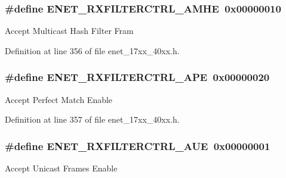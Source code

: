 \subsubsection[{\texorpdfstring{E\+N\+E\+T\+\_\+\+R\+X\+F\+I\+L\+T\+E\+R\+C\+T\+R\+L\+\_\+\+A\+M\+HE}{ENET_RXFILTERCTRL_AMHE}}]{\setlength{\rightskip}{0pt plus 5cm}\#define E\+N\+E\+T\+\_\+\+R\+X\+F\+I\+L\+T\+E\+R\+C\+T\+R\+L\+\_\+\+A\+M\+HE~0x00000010}\hypertarget{group__ENET__17XX__40XX_ga9d6abb88eb71199e6b8206c71ecc1148}{}\label{group__ENET__17XX__40XX_ga9d6abb88eb71199e6b8206c71ecc1148}
Accept Multicast Hash Filter Fram 

Definition at line 356 of file enet\+\_\+17xx\+\_\+40xx.\+h.

\subsubsection[{\texorpdfstring{E\+N\+E\+T\+\_\+\+R\+X\+F\+I\+L\+T\+E\+R\+C\+T\+R\+L\+\_\+\+A\+PE}{ENET_RXFILTERCTRL_APE}}]{\setlength{\rightskip}{0pt plus 5cm}\#define E\+N\+E\+T\+\_\+\+R\+X\+F\+I\+L\+T\+E\+R\+C\+T\+R\+L\+\_\+\+A\+PE~0x00000020}\hypertarget{group__ENET__17XX__40XX_ga86aaaa49bc70fe343262a4373c056c87}{}\label{group__ENET__17XX__40XX_ga86aaaa49bc70fe343262a4373c056c87}
Accept Perfect Match Enable 

Definition at line 357 of file enet\+\_\+17xx\+\_\+40xx.\+h.

\subsubsection[{\texorpdfstring{E\+N\+E\+T\+\_\+\+R\+X\+F\+I\+L\+T\+E\+R\+C\+T\+R\+L\+\_\+\+A\+UE}{ENET_RXFILTERCTRL_AUE}}]{\setlength{\rightskip}{0pt plus 5cm}\#define E\+N\+E\+T\+\_\+\+R\+X\+F\+I\+L\+T\+E\+R\+C\+T\+R\+L\+\_\+\+A\+UE~0x00000001}\hypertarget{group__ENET__17XX__40XX_ga61d70abfbcb89e08b14d7aa571520db3}{}\label{group__ENET__17XX__40XX_ga61d70abfbcb89e08b14d7aa571520db3}
Accept Unicast Frames Enable 

